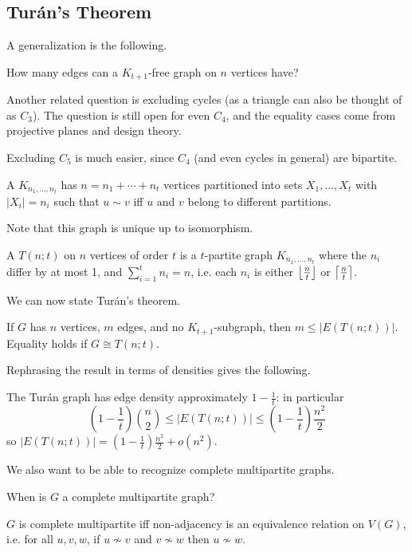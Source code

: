 \documentclass[main.tex]{subfiles}
\begin{document}
\subsection{Tur\'an's Theorem}
A generalization is the following.
\begin{question*}
  How many edges can a $K_{t+1}$-free graph on $n$ vertices have?
\end{question*}
Another related question is excluding cycles (as a triangle can also be thought
of as $C_3$).
The question is still open for even $C_4$, and the equality cases come from
projective planes and design theory.

Excluding $C_5$ is much easier,
since $C_4$ (and even cycles in general) are bipartite.

\begin{definition*}
  A 
  $K_{n_1,\ldots,n_t}$ has $n = n_1 + \cdots + n_t$ vertices partitioned into
  sets $X_1,\ldots,X_t$ with $|X_i| = n_i$ such that $u\sim v$ iff
  $u$ and $v$ belong to different partitions.
\end{definition*}
Note that this graph is unique up to isomorphism.
\begin{definition*}
  A  $T(n;t)$ on $n$ vertices of order $t$ is a $t$-partite
  graph $K_{n_1,\ldots,n_t}$ where the $n_i$ differ by at most 1, and
  $\sum_{i=1}^t n_i = n$, i.e. each $n_i$ is either $\left\lfloor \frac n t \right\rfloor$ or
  $\left\lceil \frac n t \right\rceil$.
\end{definition*}
We can now state Tur\'an's theorem.
\begin{theorem}[Tur\'an 1941]
  \th\label{thm:turan}
  If $G$ has $n$ vertices, $m$ edges, and no $K_{t+1}$-subgraph,
  then $m\leq|E(T(n;t))|$.
  Equality holds if $G\cong T(n;t)$.
\end{theorem}
Rephrasing the result in terms of densities gives the following.
\begin{remark*}
  The Tur\'an graph has edge density approximately $1 - \frac{1}{t}$:
  in particular
  \[
    \left(1 - \frac{1}{t}\right)\binom n 2\leq|E(T(n;t))|
    \leq\left(1 - \frac{1}{t}\right)\frac{n^2}{2}
  \]
  so $|E(T(n;t))| = \left(1 - \frac 1 t\right)\frac{n^2}{2} + o(n^2)$.
\end{remark*}
We also want to be able to recognize complete multipartite graphs.
\begin{question*}
  When is $G$ a complete multipartite graph?
\end{question*}
\begin{soln}
  $G$ is complete multipartite iff non-adjacency
  is an equivalence relation on $V(G)$, i.e. for all $u,v,w$, if
  $u\not\sim v$ and $v\not\sim w$ then $u\not\sim w$.
\end{soln}
\end{document}
